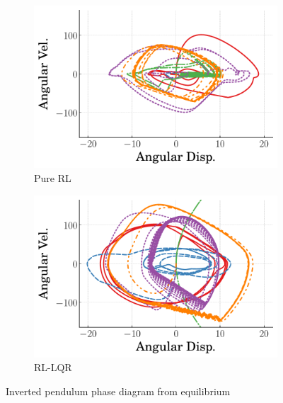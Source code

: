 \begin{figure}[tb]
  \centering
  \begin{subfigure}[b]{0.49\textwidth}
      \centering
      \includegraphics[width=\textwidth]{figures/figures_stability/time_responses_invpend/invpend_pure_RL/invpend_pure_RL_phase_plots.pdf}
      \caption{Pure RL}
      \label{subfig_chap3:invpend_at_equil_phase_plot_pure_RL}
  \end{subfigure}
  \hfill
  \begin{subfigure}[b]{0.49\textwidth}
      \centering
      \includegraphics[width=\textwidth]{figures/figures_stability/time_responses_invpend/invpend_RL_LQR/invpend_RL_LQR_phase_plots.pdf}
      \caption{RL-LQR}
      \label{subfig_chap3:invpend_at_equil_phase_plot_RL_LQR}
  \end{subfigure}
  \caption{Inverted pendulum phase diagram from equilibrium}
  \label{fig_chap3:invpend_at_equil_phase_plot}
\end{figure}
%

